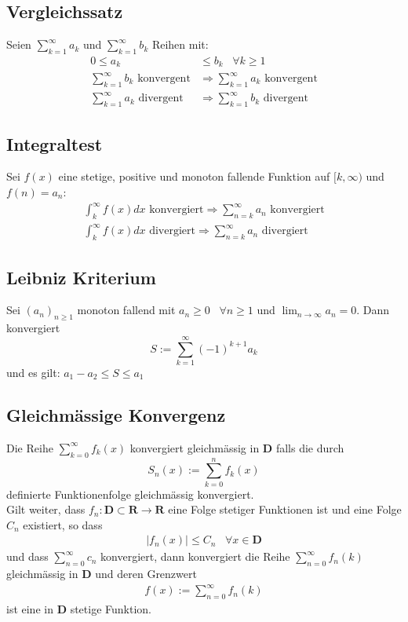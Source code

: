 \documentclass[8pt]{article}
\begin{document}
\begin{multicols*}{3}
\subsection{Vergleichssatz}

Seien $\sum_{k = 1}^\infty a_k$ und $\sum_{k = 1}^\infty b_k$ Reihen mit:
\begin{align*}
  0 \leq a_k &\leq b_k \; \; \; \forall k \geq 1\\
  \sum_{k = 1}^\infty b_k \text{ konvergent} &\Rightarrow \sum_{k = 1}^\infty a_k \text{ konvergent}\\
  \sum_{k = 1}^\infty a_k \text{ divergent} &\Rightarrow \sum_{k = 1}^\infty b_k \text{ divergent}
\end{align*}
\subsection{Integraltest}

Sei $f(x)$ eine stetige, positive und monoton fallende
Funktion auf $[k, \infty)$ und $f(n) = a_n$:
\begin{align*}
\int_{k}^{\infty} f(x) dx \text{ konvergiert} \Rightarrow \sum_{n = k}^{\infty} a_n \text{ konvergiert}\\
\int_{k}^{\infty} f(x) dx \text{ divergiert}  \Rightarrow \sum_{n = k}^{\infty} a_n \text{ divergiert}
\end{align*}

\subsection{Leibniz Kriterium}

Sei $(a_n)_{n \geq 1}$ monoton fallend mit $a_n \geq 0 \; \; \; \forall n \geq 1$ und
$\lim_{n \rightarrow \infty} a_n = 0$. Dann konvergiert
$$
  S := \sum_{k = 1}^\infty (-1)^{k + 1} a_k
$$
und es gilt: $a_1 - a_2 \leq S \leq a_1$

\subsection{Gleichmässige Konvergenz}

Die Reihe $\sum_{k=0}^\infty f_k(x)$ konvergiert gleichmässig in $\mathbf{D}$ falls die durch
$$
  S_n(x) := \sum_{k=0}^n f_k(x)
$$
definierte Funktionenfolge gleichmässig konvergiert.\\
Gilt weiter, dass $f_n: \mathbf{D} \subset \mathbf{R} \rightarrow \mathbf{R}$ eine Folge
stetiger Funktionen ist und eine Folge $C_n$ existiert, so dass
\begin{align*}
  |f_n(x)| \leq C_n \;\;\; \forall x \in \mathbf{D}
\end{align*}
und dass $\sum_{n = 0}^\infty c_n$ konvergiert, dann konvergiert die Reihe
$\sum_{n = 0}^\infty f_n(k)$ gleichmässig in $\mathbf{D}$ und deren Grenzwert
\begin{align*}
  f(x) := \sum_{n = 0}^\infty f_n(k)
\end{align*}
ist eine in $\mathbf{D}$ stetige Funktion.

\end{multicols*}
\end{document}
